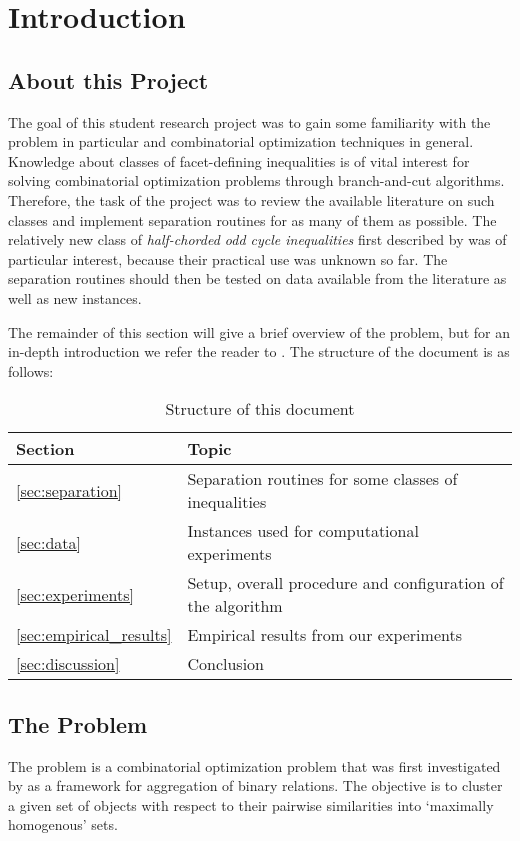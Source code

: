 \section{Introduction}
\subsection{About this Project}\label{subsec:about}
The goal of this student research project was to gain some familiarity with the \CP problem in particular and combinatorial optimization techniques in general.
Knowledge about classes of facet-defining inequalities is of vital interest for solving combinatorial optimization problems through branch-and-cut algorithms.
Therefore, the task of the project was to review the available literature on such classes and implement separation routines for as many of them as possible.
The relatively new class of \textit{half-chorded odd cycle inequalities} first described by \cite{andresPolyhedralStudyLifted2022} was of particular interest, because their practical use was unknown so far.
The separation routines should then be tested on data available from the literature as well as new instances.

The remainder of this section will give a brief overview of the \CP problem, but for an in-depth introduction we refer the reader to \cite{grotschelFacetsCliquePartitioning1990}.
The structure of the document is as follows:
\begin{table}[h]
	\centering
	\begin{tabular}{@{}ll@{}}
		\toprule
		Section & Topic \\
		\midrule
		\cref{sec:separation}& Separation routines for some classes of inequalities \\
		\cref{sec:data}& Instances used for computational experiments \\
		\cref{sec:experiments}& Setup, overall procedure and configuration of the algorithm \\
		\cref{sec:empirical_results}& Empirical results from our experiments \\
		\cref{sec:discussion}& Conclusion \\
		\bottomrule
	\end{tabular}
	\vspace{10pt}
	\caption{Structure of this document}
\end{table}

\subsection{The \CP Problem}\label{subsec:cp_problem}
The \CP problem is a combinatorial optimization problem that was first investigated by \cite{grotschelFacetsCliquePartitioning1990} as a framework for aggregation of binary relations.
The objective is to cluster a given set of objects with respect to their pairwise similarities into ‘maximally homogenous’ sets.

